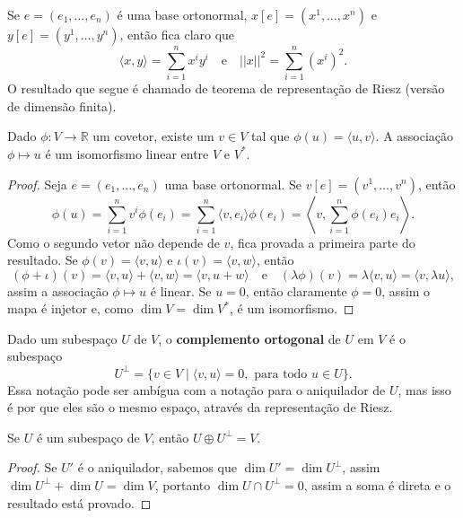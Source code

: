 Se $e = (e_1, \dots, e_n)$ é uma base ortonormal, $x[e] = (x^1, \dots, x^n)$ e $y[e] = (y^1, \dots, y^n)$, então fica claro que \begin{equation}
    \langle x, y \rangle = \sum_{i = 1}^n x^i y^i \quad \text{e} \quad ||x||^2 = \sum_{i = 1}^n (x^i)^2.
\end{equation} O resultado que segue é chamado de teorema de representação de Riesz (versão de dimensão finita).

\begin{theorem}
    Dado $\phi \colon V \to \mathbb{R}$ um covetor, existe um $v \in V$ tal que $\phi(u) = \langle u, v \rangle$. A associação $\phi \mapsto u$ é um isomorfismo linear entre $V$ e $V^*$.
\end{theorem}
\begin{proof}
    Seja $e = (e_1, \dots, e_n)$ uma base ortonormal. Se $v[e] = (v^1, \dots, v^n)$, então \begin{equation}
        \phi(u) = \sum_{i = 1}^n v^i \phi(e_i) = \sum_{i = 1}^n \langle v, e_i \rangle \phi(e_i) = \left\langle v, \sum_{i = 1}^n \phi(e_i) e_i \right\rangle.
    \end{equation} Como o segundo vetor não depende de $v$, fica provada a primeira parte do resultado. Se $\phi(v) = \langle v, u \rangle$ e $\iota(v) = \langle v, w \rangle$, então \begin{equation}
        (\phi + \iota)(v) = \langle v, u \rangle + \langle v, w \rangle = \langle v, u + w \rangle \quad \text{e} \quad (\lambda \phi)(v) = \lambda \langle v, u \rangle = \langle v, \lambda u \rangle,
    \end{equation} assim a associação $\phi \mapsto u$ é linear. Se $u = 0$, então claramente $\phi = 0$, assim o mapa é injetor e, como $\dim V = \dim V^*$, é um isomorfismo.
\end{proof}

Dado um subespaço $U$ de $V$, o \textbf{complemento ortogonal} de $U$ em $V$ é o subespaço \begin{equation}
    U^\perp = \{v \in V \mid \langle v, u \rangle = 0, \text{ para todo } u \in U\}.
\end{equation} Essa notação pode ser ambígua com a notação para o aniquilador de $U$, mas isso é por que eles são o mesmo espaço, através da representação de Riesz.

\begin{proposition}
    Se $U$ é um subespaço de $V$, então $U \oplus U^\perp = V$.
\end{proposition}
\begin{proof}
    Se $U'$ é o aniquilador, sabemos que $\dim U' = \dim U^\perp$, assim $\dim U^\perp + \dim U = \dim V$, portanto $\dim U \cap U^\perp = 0$, assim a soma é direta e o resultado está provado.
\end{proof}

